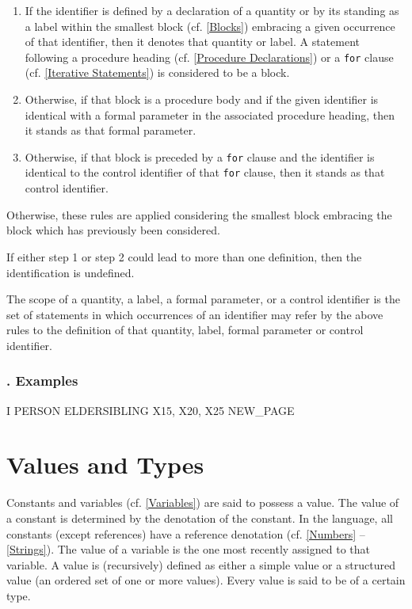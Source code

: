 \documentclass[a4paper]{article}
\def\quietsubsubsection#1{\addtocounter{subsubsection}{1}\subsubsection*{\thesubsubsection. #1}}
\def\Examples{\quietsubsubsection{Examples}}
\def\R#1{\lstinline[language=AlgolW,style=ReferenceManual]{#1}}
\begin{document}
\begin{enumerate}[{Step} 1.]
\item If the identifier is defined by a declaration of a quantity or
  by its standing as a label within the smallest block (cf.
  \ref{Blocks}) embracing a given occurrence of that identifier, then
  it denotes that quantity or label. A statement following a procedure
  heading (cf. \ref{Procedure Declarations}) or a \R{for} clause (cf.
  \ref{Iterative Statements}) is considered to be a block.

\item Otherwise, if that block is a procedure body and if the given
  identifier is identical with a formal parameter in the associated
  procedure heading, then it stands as that formal parameter.

\item Otherwise, if that block is preceded by a \R{for} clause
  and the identifier is identical to the control identifier of that
  \R{for} clause, then it stands as that control identifier.
\end{enumerate}

Otherwise, these rules are applied considering the smallest block
embracing the block which has previously been considered.

If either step 1 or step 2 could lead to more than one definition,
then the identification is undefined.

The scope of a quantity, a label, a formal parameter, or a control
identifier is the set of statements in which occurrences of an
identifier may refer by the above rules to the definition of that
quantity, label, formal parameter or control identifier.

\Examples

\begin{AlgolWExample}
I
PERSON
ELDERSIBLING
X15, X20, X25
NEW_PAGE
\end{AlgolWExample}



\newpage
\section{Values and Types}
\label{Values and Types}

Constants and variables (cf.  \ref{Variables}) are said to possess a
value.  The value of a constant is determined by the denotation of the
constant.  In the language, all constants (except references) have a
reference denotation (cf. \ref{Numbers} -- \ref{Strings}).  The value
of a variable is the one most recently assigned to that variable. A
value is (recursively) defined as either a simple value or a
structured value (an ordered set of one or more values). Every value
is said to be of a certain type.
\end{document}
